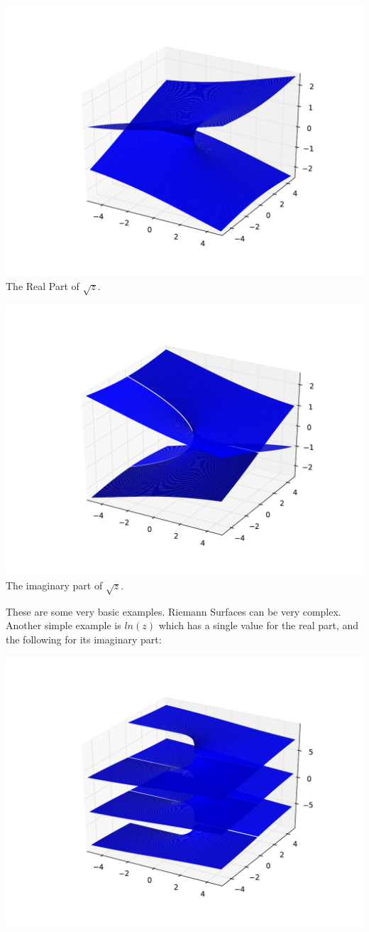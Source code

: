 \includegraphics[width=\textwidth]{RiemannSurface1}
The Real Part of $\sqrt{z}$.

\includegraphics[width=\textwidth]{RiemannSurface2}
The imaginary part of $\sqrt{z}$.

These are some very basic examples. Riemann Surfaces can be very complex. Another simple example is $ln(z)$ which has a single value for the real part, and the following for its imaginary part:

\includegraphics[width=\textwidth]{RiemannSurface3}


